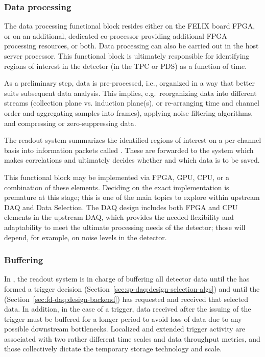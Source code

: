 \subsubsection{Data processing}

The data processing functional block resides either on the FELIX board FPGA, or on
an additional, dedicated co-processor providing additional FPGA
processing resources, or both. Data processing can also be carried out in the host
server processor. This functional block is ultimately
responsible for identifying regions of interest in the
detector (in the TPC or PDS) as a function of time.

As a preliminary step, data is pre-processed, i.e., organized in a way
that better suits subsequent data analysis. This implies, e.g.~reorganizing
data into different streams (collection plane vs. induction plane(s),
or re-arranging time and channel order and aggregating samples into frames), applying noise filtering algorithms, and compressing or zero-suppressing data.

The readout system summarizes the identified regions of interest
on a per-channel basis into information packets
called .  These are forwarded to the
 system which makes correlations and ultimately decides whether and which data is to be saved.

This functional block may be implemented via FPGA, GPU, CPU, or a
combination of these elements. Deciding on the exact implementation is
premature at this stage; this is one of the main topics to explore
within upstream DAQ and Data Selection. The DAQ design includes both FPGA and
CPU elements in the upstream DAQ, which provides the needed
flexibility and 
adaptability to meet the ultimate processing needs of the detector;
those will depend, for example, on noise levels in the detector.

\subsubsection{Buffering}

In , the readout system is in charge of buffering all
detector data until the  has formed a trigger decision
(Section~\ref{sec:sp-daq:design-selection-algs}) and until the
 (Section~\ref{sec:fd-daq:design-backend}) has requested and received that selected data. 
In addition, in the case of a  trigger, data received after
the issuing of the trigger must be buffered for a longer period to
avoid loss of data due to any possible downstream
bottlenecks. Localized and extended trigger activity are associated
with two rather different time scales and data throughput metrics, and
those collectively dictate the temporary storage technology and scale. 

